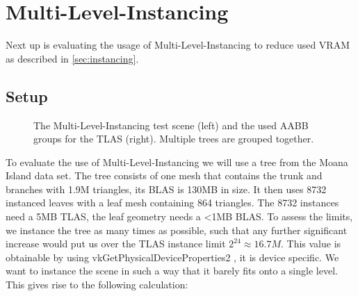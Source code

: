 \section{Multi-Level-Instancing}
\label{sec:INSTTEST}
Next up is evaluating the usage of Multi-Level-Instancing to reduce used VRAM as described in \ref{sec:instancing}.
\subsection{Setup}
\begin{figure}
\hfill
{}
\hfill
{}
\hfill
\caption{The Multi-Level-Instancing test scene (left) and the used AABB groups for the TLAS (right). Multiple trees are grouped together.}
\label{fig:MLRender}
\end{figure}
To evaluate the use of Multi-Level-Instancing we will use a tree from the Moana Island data set. The tree consists of one mesh that contains the trunk and branches with 1.9M triangles, its BLAS is 130MB in size. It then uses 8732 instanced leaves with a leaf mesh containing 864 triangles. The 8732 instances need a 5MB TLAS, the leaf geometry needs a <1MB BLAS. To assess the limits, we instance the tree as many times as possible, such that any further significant increase would put us over the TLAS instance limit $2^{24} \approx 16.7M$. This value is obtainable by using vkGetPhysicalDeviceProperties2 \cite{vulkanSpec}, it is device specific. We want to instance the scene in such a way that it barely fits onto a single level. This gives rise to the following calculation:
